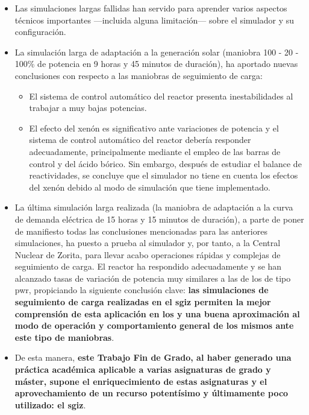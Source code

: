 \begin{itemize}
\begin{itemize}
    \end{itemize} 
    \item Las simulaciones largas fallidas han servido para aprender varios aspectos técnicos importantes ---incluida alguna limitación--- sobre el simulador y su configuración.
    \item La simulación larga de adaptación a la generación solar (maniobra 100 - 20 - 100\% de potencia en 9 horas y 45 minutos de duración), ha aportado nuevas conclusiones con respecto a las maniobras de seguimiento de carga:
    \begin{itemize}
        \item El sistema de control automático del reactor presenta inestabilidades al trabajar a muy bajas potencias.
        \item El efecto del xenón es significativo ante variaciones de potencia y el sistema de control automático del reactor debería responder adecuadamente, principalmente mediante el empleo de las barras de control y del ácido bórico. Sin embargo, después de estudiar el balance de reactividades, se concluye que el simulador no tiene en cuenta los efectos del xenón debido al modo de simulación que tiene implementado.
    \end{itemize} 
    \item La última simulación larga realizada (la maniobra de adaptación a la curva de demanda eléctrica de 15 horas y 15 minutos de duración), a parte de poner de manifiesto todas las conclusiones mencionadas para las anteriores simulaciones, ha puesto a prueba al simulador y, por tanto, a la Central Nuclear de Zorita, para llevar acabo operaciones rápidas y complejas de seguimiento de carga. El reactor ha respondido adecuadamente y se han alcanzado tasas de variación de potencia muy similares a las de los  de tipo \acrshort{pwr}, propiciando la siguiente conclusión clave: \textbf{las simulaciones de seguimiento de carga realizadas en el \acrshort{sgiz} permiten la mejor comprensión de esta aplicación en los  y una buena aproximación al modo de operación y comportamiento general de los mismos ante este tipo de maniobras}.
    \item De esta manera, \textbf{este Trabajo Fin de Grado, al haber generado una práctica académica aplicable a varias asignaturas de grado y máster, supone el enriquecimiento de estas asignaturas y el aprovechamiento de un recurso potentísimo y últimamente poco utilizado: el \acrshort{sgiz}}.
\end{itemize}

